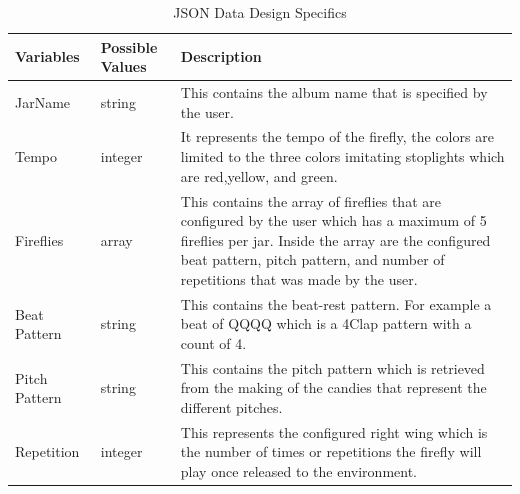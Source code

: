 \begin{landscape}
\begin{table}
\centering
\caption{JSON Data Design Specifics}
\label{XML}
\begin{tabular}{|p{2.8cm}|p{6.6cm}|p{9cm}|} 
\hline
\textbf{Variables} & \textbf{Possible Values}  & \textbf{Description}                                                                                                                                                                                                                    \\ 
\hline
JarName~~          & string~                   & This contains the album name that is specified by the user.                                                                                                                                                                             \\ 
\hline
Tempo              & integer~                  & It represents the tempo of the firefly, the colors are limited to the three colors imitating stoplights which are red,yellow, and green.                                                                                                \\ 
\hline
Fireflies          & array~                    & This contains the array of fireflies that are configured by the user which has a maximum of 5 fireflies per jar. Inside the array are the configured beat pattern, pitch pattern, and number of repetitions that was made by the user.  \\ 
\hline
Beat Pattern       & string                    & This contains the beat-rest pattern. For example a beat of QQQQ which is a 4Clap pattern with a count of 4.                                                                                                                             \\ 
\hline
Pitch Pattern      & string                    & This contains the pitch pattern which is retrieved from the making of the candies that represent the different pitches.                                                                                                                 \\ 
\hline
Repetition         & integer                   & This represents the configured right wing which is the number of times or repetitions the firefly will play once released to the environment.                                                                                           \\
\hline
\end{tabular}
\end{table}
\end{landscape}

